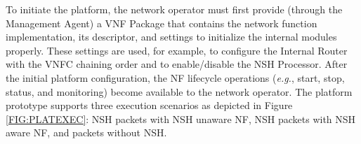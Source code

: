To initiate the platform, the network operator must first provide (through the Management Agent) a VNF Package that contains the network function implementation, its descriptor, and settings to initialize the internal modules properly. These settings are used, for example, to configure the Internal Router with the VNFC chaining order and to enable/disable the NSH Processor. After the initial platform configuration, the NF lifecycle operations (\textit{e.g.}, start, stop, status, and monitoring) become available to the network operator. The platform prototype supports three execution scenarios as depicted in Figure \ref{FIG:PLATEXEC}: NSH packets with NSH unaware NF, NSH packets with NSH aware NF, and packets without NSH.





